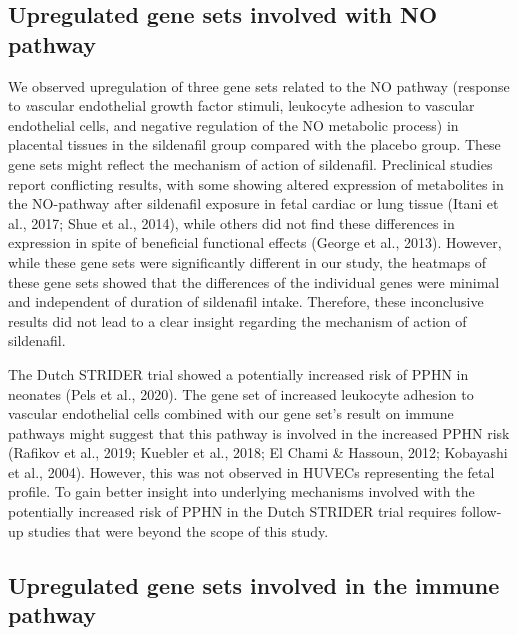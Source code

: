 \documentclass[authordate, empirical,issue]{jote-new-article}
\begin{document}
\subsection{Upregulated gene sets involved with NO pathway }



We observed upregulation of three gene sets related to the NO pathway (response to \emph{v}ascular endothelial growth factor stimuli, leukocyte adhesion to vascular endothelial cells, and negative regulation of the NO metabolic process) in placental tissues in the sildenafil group compared with the placebo group. These gene sets might reflect the mechanism of action of sildenafil. Preclinical studies report conflicting results, with some showing altered expression of metabolites in the NO-pathway after sildenafil exposure in fetal cardiac or lung tissue (Itani et al., 2017; Shue et al., 2014), while others did not find these differences in expression in spite of beneficial functional effects (George et al., 2013). However, while these gene sets were significantly different in our study, the heatmaps of these gene sets showed that the differences of the individual genes were minimal and independent of duration of sildenafil intake. Therefore, these inconclusive results did not lead to a clear insight regarding the mechanism of action of sildenafil.



The Dutch STRIDER trial showed a potentially increased risk of PPHN in neonates (Pels et al., 2020). The gene set of increased leukocyte adhesion to vascular endothelial cells combined with our gene set's result on immune pathways might suggest that this pathway is involved in the increased PPHN risk (Rafikov et al., 2019; Kuebler et al., 2018; El Chami \& Hassoun, 2012; Kobayashi et al., 2004). However, this was not observed in HUVECs representing the fetal profile. To gain better insight into underlying mechanisms involved with the potentially increased risk of PPHN in the Dutch STRIDER trial requires follow-up studies that were beyond the scope of this study.







\subsection{Upregulated gene sets involved in the immune pathway }
\end{document}
